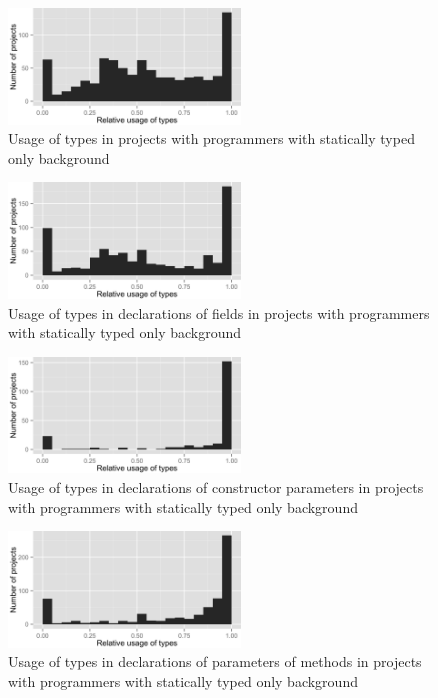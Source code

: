 \begin{figure}[h]
\centering 
\includegraphics[width=0.55\textwidth]{../aosd_2014/analysis/result/background/static-only/histograms/5_all_types.png} 
\caption{Usage of types in projects with programmers with statically typed only background}
\end{figure}

\begin{figure}[h]
\centering 
\includegraphics[width=0.55\textwidth]{../aosd_2014/analysis/result/background/static-only/histograms/10_Field.png} 
\caption{Usage of types in declarations of fields in projects with programmers with statically typed only background}
\end{figure}

\begin{figure}[h]
\centering 
\includegraphics[width=0.55\textwidth]{../aosd_2014/analysis/result/background/static-only/histograms/9_Constructor_Parameter.png} 
\caption{Usage of types in declarations of constructor parameters in projects with programmers with statically typed only background}
\end{figure}

\begin{figure}[h]
\centering 
\includegraphics[width=0.55\textwidth]{../aosd_2014/analysis/result/background/static-only/histograms/8_Method_Parameter.png} 
\caption{Usage of types in declarations of parameters of methods in projects with programmers with statically typed only background}
\end{figure}


